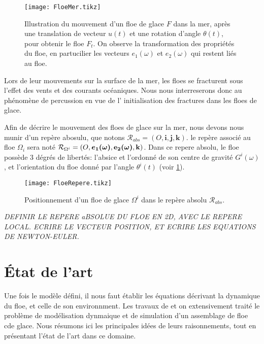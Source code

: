 \begin{figure}[!h]
    \centering
    \texttt{[image: FloeMer.tikz]}
    \caption{Illustration du mouvement d'un floe de glace $F$ dans la mer, après une translation de vecteur $u(t)$ et une rotation d'angle $\theta(t)$, pour obtenir le floe $F_t$. On observe la transformation des propriétés du floe, en partucilier les vecteurs $e_1(\omega)$ et $e_2(\omega)$ qui restent liés au floe.}
\end{figure}


Lors de leur mouvements sur la surface de la mer, les floes se fracturent sous l'effet des vents et des courants océaniques. Nous nous interreserons donc au phénomène de percussion en vue de l' initialisation des fractures dans les floes de glace. 


Afin de décrire le mouvement des floes de glace sur la mer, nous devons nous munir d'un repère abosulu, que notons $\mathcal{R}_{abs} = (O, \bm i, \bm j, \bm k)$. le repère associé au floe $\Omega_i$ sera noté $\mathcal{R}_{\Omega^i} = (O, \bm {\bm{e_1}(\omega)}, \bm{\mathrm{\bm{e_2}(\omega)}}, \bm{\mathrm{k}})$. Dans ce repere absolu, le floe possède 3 dégrés de libertés: l'absice et l'ordonné de son centre de gravité $G^i(\omega)$, et l'orientation du floe donné par l'angle $\theta^i (t)$ (voir \cref{fig:FloeRepere}). 

\begin{figure}[!h]
    \centering
    \texttt{[image: FloeRepere.tikz]}
    \caption{Positionnement d'un floe de glace $\Omega^i$ dans le repère absolu $\mathcal{R}_{abs}$.}
    \label{fig:FloeRepere}
\end{figure}


\textit{DEFINIR LE REPERE aBSOLUE DU FLOE EN 2D, AVEC LE REPERE LOCAL. ECRIRE LE VECTEUR POSITION, ET ECRIRE LES EQUATIONS DE NEWTON-EULER.}





\section{État de l'art}

Une fois le modèle défini, il nous faut établir les équations décrivant la dynamique du floe, et celle de son environnment. Les travaux de \cite{rabatel2015thesis} et \cite{balasoiu2020thesis} on extensivement traité le problème de modélisation dynmaique et de simulation d'un assemblage de floe cde glace. Nous résumons ici les principales idées de leurs raisonnements, tout en présentant l'état de l'art dans ce domaine.

